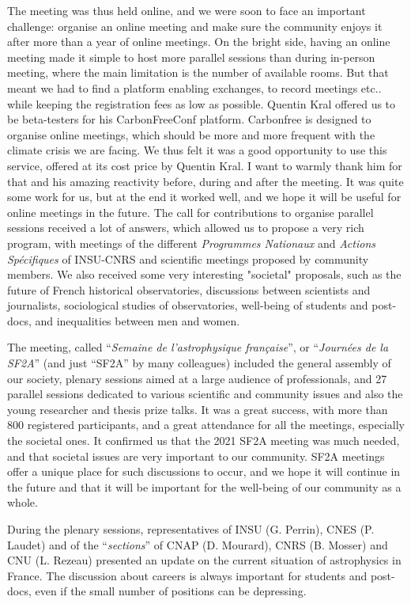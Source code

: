 The meeting was thus held online, and we were soon to face an important challenge: organise an online meeting and make sure the community enjoys it after more than a year of  online meetings. On the bright side, having an online meeting made it simple to host more parallel sessions than during in-person meeting, where the main limitation is the number of available rooms. But that meant we had to find a platform enabling exchanges, to record meetings etc.. while keeping the registration fees as low as possible. Quentin Kral offered us to be beta-testers for his CarbonFreeConf platform. Carbonfree is  designed to organise online meetings, which should be more and more frequent with the climate crisis we are facing. We thus felt it was a good opportunity to use this service, offered at its cost price by Quentin Kral. I want to warmly thank him for that and his amazing reactivity before, during and after the meeting. It was quite some work for us, but at the end it worked well, and we hope it will be useful for online meetings in the future.
%
The call for contributions to organise parallel sessions received a lot of answers, which allowed us to propose a very rich program, with meetings of the different \emph{Programmes Nationaux} and \emph{Actions Sp\'ecifiques} of INSU-CNRS and scientific meetings proposed by community members. We also received some very interesting "societal" proposals, such as the future of French historical observatories, discussions between scientists and journalists, sociological studies of observatories, well-being of students and post-docs, and inequalities between men and women.

The meeting, called  ``\emph{Semaine de l'astrophysique fran\c{c}aise}'', or ``\emph{Journ\'ees de la SF2A}'' (and just ``SF2A'' by many colleagues)  included
the general assembly of our society, plenary sessions aimed at a large audience of professionals, and 27 parallel sessions  dedicated to various scientific and community issues and also the young researcher and thesis prize talks.  It was a great success, with more than 800 registered participants, and a great attendance for all the meetings, especially the societal ones. It confirmed us that the 2021 SF2A meeting was much needed, and that societal issues are very important to our community. SF2A meetings offer a unique place for such discussions to occur, and we hope it will continue in the future and that it will be important for the well-being of our community as a whole.



%
During the plenary sessions, re\-pre\-sen\-ta\-ti\-ves of INSU (G. Perrin), CNES (P. Laudet) and of the ``\emph{sections}'' of CNAP (D. Mourard), CNRS (B. Mosser) and CNU (L. Rezeau) presented an update on the current situation of astrophysics in France. The discussion about careers is always important for students and post-docs, even if the small number of positions can be depressing.

